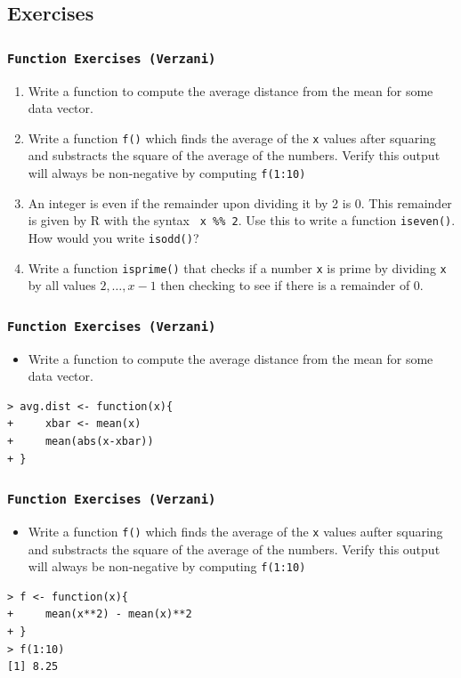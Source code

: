 \documentclass[xcolor={table},c]{beamer}
\begin{document}
\subsection{Exercises}
\begin{frame}[fragile]\frametitle{\texttt{Function Exercises (Verzani)}}
  \begin{enumerate}
  \item Write a function to compute the average distance from the mean for some data vector.
  \item Write a function \texttt{f()} which finds the average of the \texttt{x} values after squaring and substracts the square of the average of the numbers. Verify this output will always be non-negative by computing \texttt{f(1:10)}
  \item An integer is even if the remainder upon dividing it by 2 is 0. This remainder is given by R with the syntax \texttt{ x \%\% 2}. Use this to write a function \texttt{iseven()}. How would you write \texttt{isodd()}?
  \item Write a function \texttt{isprime()} that checks if a number \texttt{x} is prime by dividing \texttt{x} by all values \texttt{$2,\ldots,x-1$} then checking to see if there is a remainder of 0. 
  \end{enumerate}
\end{frame}


\begin{frame}[fragile]\frametitle{\texttt{Function Exercises (Verzani)}}
  \begin{itemize}
  \item Write a function to compute the average distance from the mean for some data vector.
  \end{itemize}
\begin{verbatim}
> avg.dist <- function(x){
+     xbar <- mean(x)
+     mean(abs(x-xbar))
+ }  
\end{verbatim}
\end{frame}

\begin{frame}[fragile]\frametitle{\texttt{Function Exercises (Verzani)}}
  \begin{itemize}
  \item Write a function \texttt{f()} which finds the average of the \texttt{x} values aufter squaring and substracts the square of the average of the numbers. Verify this output will always be non-negative by computing \texttt{f(1:10)}
  \end{itemize}
\begin{verbatim}
> f <- function(x){
+     mean(x**2) - mean(x)**2
+ }
> f(1:10)
[1] 8.25  
\end{verbatim}
\end{frame}
\end{document}

